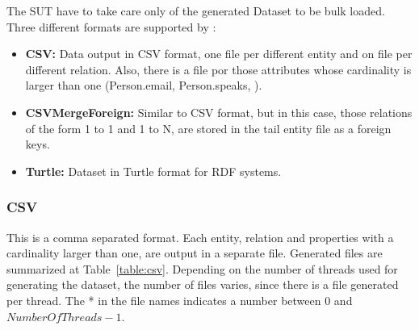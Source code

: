 The SUT have to take care only of the generated Dataset to be bulk loaded.
Three different formats are supported by \datagen:

\begin{itemize}
  \item \textbf{CSV:} Data output in CSV format, one file per different entity and on file
    per different relation. Also, there is a file por those attributes whose
    cardinality is larger than one (\ie Person.email, Person.speaks, \etc).
  \item \textbf{CSVMergeForeign:} Similar to CSV format, but in this case, those
    relations of the form 1 to 1 and 1 to N, are stored in the tail entity file as
    a foreign keys.
  \item \textbf{Turtle:} Dataset in Turtle format for RDF systems.
\end{itemize}



\subsubsection{CSV}

This is a comma separated format. Each entity, relation and properties with a
cardinality larger than one, are output in a separate file. Generated files are
summarized at Table~\ref{table:csv}.  Depending on the number of threads used
for generating the dataset, the number of files varies, since there is a file
generated per thread. The * in the file names indicates a number between 0 and
$\mathit{NumberOfThreads}-1$.

